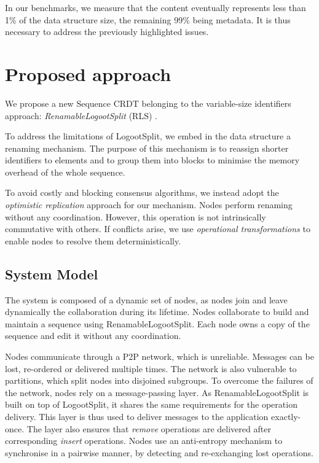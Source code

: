 \documentclass[sigplan,10pt]{acmart}
\begin{document}
In our benchmarks, we measure that the content eventually represents less than 1\% of the data structure size, the remaining 99\% being metadata.
It is thus necessary to address the previously highlighted issues.

\section{Proposed approach}
\label{sec:proposition}

We propose a new Sequence \ac{CRDT} belonging to the variable-size identifiers approach: \emph{RenamableLogootSplit} (RLS) \cite{nicolas:hal-01932552}.

To address the limitations of LogootSplit, we embed in the data structure a renaming mechanism.
The purpose of this mechanism is to reassign shorter identifiers to elements and to group them into blocks to minimise the memory overhead of the whole sequence.

To avoid costly and blocking consensus algorithms, we instead adopt the \emph{optimistic replication} \cite{10.1145/1057977.1057980} approach for our mechanism.
Nodes perform renaming without any coordination.
However, this operation is not intrinsically commutative with others.
If conflicts arise, we use \emph{operational transformations} \cite{10.1145/289444.289469,4668339} to enable nodes to resolve them deterministically.

\subsection{System Model}

The system is composed of a dynamic set of nodes, as nodes join and leave dynamically the collaboration during its lifetime.
Nodes collaborate to build and maintain a sequence using RenamableLogootSplit.
Each node owns a copy of the sequence and edit it without any coordination.

Nodes communicate through a \ac{P2P} network, which is unreliable.
Messages can be lost, re-ordered or delivered multiple times.
The network is also vulnerable to partitions, which split nodes into disjoined subgroups.
To overcome the failures of the network, nodes rely on a message-passing layer.
As RenamableLogootSplit is built on top of LogootSplit, it shares the same requirements for the operation delivery.
This layer is thus used to deliver messages to the application exactly-once.
The layer also ensures that \emph{remove} operations are delivered after corresponding \emph{insert} operations.
Nodes use an anti-entropy mechanism to synchronise in a pairwise manner, by detecting and re-exchanging lost operations.
\end{document}
